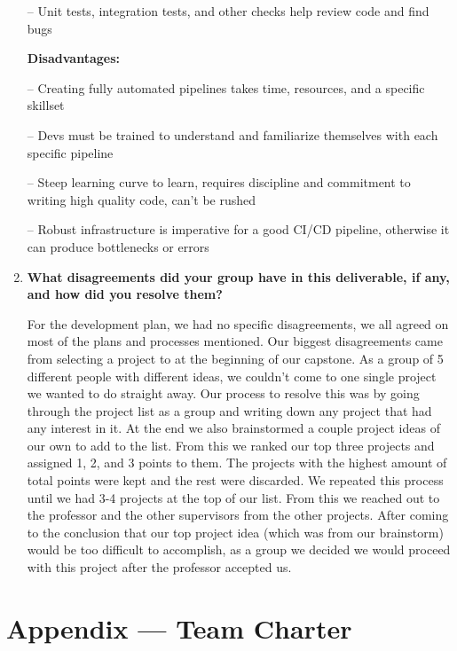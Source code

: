 \documentclass{article}
\begin{document}
\begin{enumerate}
        -- Unit tests, integration tests, and other checks help review code and find bugs

    \textbf{Disadvantages:}

        -- Creating fully automated pipelines takes time, resources, and a specific skillset
      
        -- Devs must be trained to understand and familiarize themselves with each specific pipeline 
      
        -- Steep learning curve to learn, requires discipline and commitment to writing high quality code, can’t be rushed
      
        -- Robust infrastructure is imperative for a good CI/CD pipeline, otherwise it can produce bottlenecks or errors

    \item \textbf{What disagreements did your group have in this deliverable, if any, and how did you resolve them?}

	  For the development plan, we had no specific disagreements, we all agreed on most of the plans and processes mentioned. Our biggest disagreements came from selecting a project to at the beginning of our capstone. As a group of 5 different people with different ideas, we couldn’t come to one single project we wanted to do straight away. Our process to resolve this was by going through the project list as a group and writing down any project that had any interest in it. At the end we also brainstormed a couple project ideas of our own to add to the list. From this we ranked our top three projects and assigned 1, 2, and 3 points to them. The projects with the highest amount of total points were kept and the rest were discarded. We repeated this process until we had 3-4 projects at the top of our list. From this we reached out to the professor and the other supervisors from the other projects. After coming to the conclusion that our top project idea (which was from our brainstorm) would be too difficult to accomplish, as a group we decided we would proceed with this project after the professor accepted us.

\end{enumerate}

\newpage{}

\section*{Appendix --- Team Charter}

\end{document}

